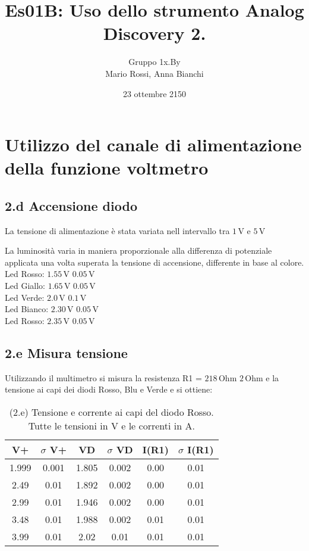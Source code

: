 \documentclass[10pt,a4paper]{article}
\author{Gruppo 1x.By \\ Mario Rossi, Anna Bianchi \rem{non dimenticate i nomi}}
\title{Es01B: Uso dello strumento Analog Discovery 2.}
\begin{document}
\date{23 ottembre 2150}
\maketitle

\setcounter{section}{1}

\section{Utilizzo del canale di alimentazione della funzione voltmetro}

\subsection*{2.d Accensione diodo}

La tensione di alimentazione \`e stata variata nell intervallo tra $1\,\mathrm{V}$ e $5\,\mathrm{V}$

La luminosit\`a varia in maniera proporzionale alla differenza di potenziale applicata una volta superata la tensione di accensione, differente in base al colore. \\
Led Rosso: $1.55\,\mathrm{V}$ \pm $0.05\,\mathrm{V}$ \\
Led Giallo: $1.65\,\mathrm{V}$ \pm $0.05\,\mathrm{V}$ \\
Led Verde: $2.0\,\mathrm{V}$ \pm $0.1\,\mathrm{V}$ \\
Led Bianco: $2.30\,\mathrm{V}$ \pm $0.05\,\mathrm{V}$ \\
Led Rosso: $2.35\,\mathrm{V}$ \pm $0.05\,\mathrm{V}$ \\
\vspace{0.5cm}

\subsection*{2.e Misura tensione}
Utilizzando il multimetro si misura la resistenza R1 = $218\,\mathrm{Ohm}$ \pm $2\,\mathrm{Ohm}$ e la tensione ai capi dei diodi Rosso, Blu e Verde e si ottiene:

\begin{table}[h]
\centering
\begin{tabular}{|c|c|c|c|c|c|}
\hline 
V+& $\sigma$ V+  & VD & $\sigma$ VD & I(R1)  & $\sigma$ I(R1) \\
\hline 
1.999 & 0.001 & 1.805 & 0.002 & 0.00 & 0.01 \\
2.49 & 0.01 & 1.892 & 0.002 & 0.00 & 0.01 \\
2.99 & 0.01 & 1.946 & 0.002 & 0.00 & 0.01 \\
3.48 & 0.01 & 1.988 & 0.002 & 0.01 & 0.01 \\
3.99 & 0.01 & 2.02 & 0.01 & 0.01 & 0.01 \\
\hline 
\end{tabular} 
\caption{(2.e) Tensione e corrente ai capi del diodo Rosso. Tutte le tensioni in V e le correnti in A.\label{t:par1}}
\end{table}
\end{document}
